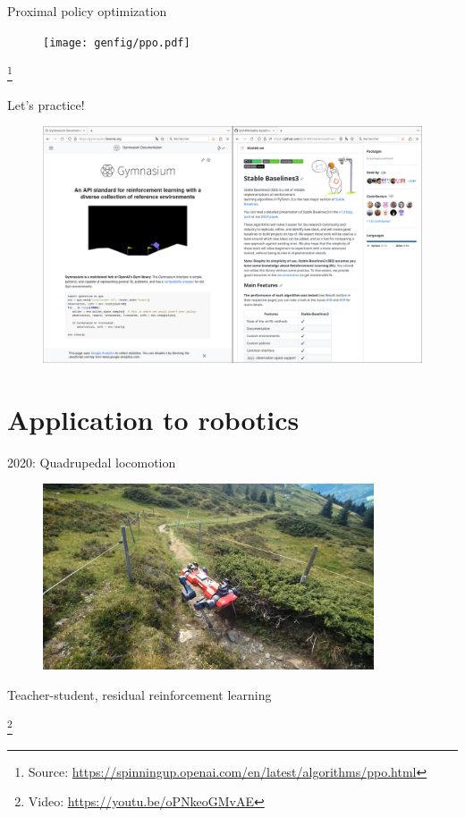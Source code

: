 \documentclass[11pt, aspectratio=169]{beamer}
\newcommand\blfootnote[1]{%
  \begingroup
  \renewcommand\thefootnote{}%
  \footnote{#1}%
  \addtocounter{footnote}{-1}%
  \endgroup
}
\begin{document}
\begin{frame}{Proximal policy optimization}
    \begin{figure}
        \texttt{[image: genfig/ppo.pdf]}
    \end{figure}
    \vspace{-0.5cm}
    \blfootnote{
        Source: \url{https://spinningup.openai.com/en/latest/algorithms/ppo.html}
    }
\end{frame}

\begin{frame}{Let's practice!}
    \begin{figure}
        \includegraphics[width=0.99\columnwidth]{figures/gymnasium-sb3.png}
    \end{figure}
\end{frame}

\section{Application to robotics}

\begin{frame}{2020: Quadrupedal locomotion~\cite{lee2020}}
    \vspace{1.5em}
    \begin{figure}
        \includegraphics[height=5.5cm]{figures/hike-with-anymal.jpg}
    \end{figure}
    \begin{center}
        Teacher-student, residual reinforcement learning
    \end{center}
    \blfootnote{
        Video: \url{https://youtu.be/oPNkeoGMvAE}
    }
\end{frame}
\end{document}
